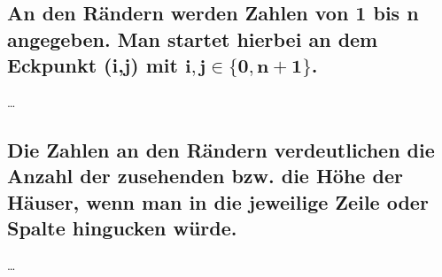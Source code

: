 \documentclass[11pt, a4paper]{article}
\begin{document}
	\subsection{An den Rändern werden Zahlen von 1 bis n angegeben. Man startet hierbei an dem Eckpunkt (i,j) mit $\boldsymbol{i,j \in \{0, n+1\}}$.}
	

	…
	
	\subsection{Die Zahlen an den Rändern verdeutlichen die Anzahl der zusehenden bzw. die Höhe der Häuser, wenn man in die jeweilige Zeile oder Spalte hingucken würde.}
	
	…
	
%	
%	
%	
%	
	
	
	
	
\end{document}
